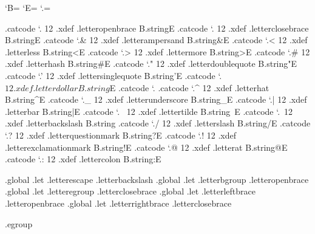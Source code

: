 


\bgroup

\catcode`B=\begingroupcatcode
\catcode`E=\endgroupcatcode
\catcode`.=\escapecatcode

.catcode `.{ 12 .xdef .letteropenbrace       B.string{E
.catcode `.} 12 .xdef .letterclosebrace      B.string}E
.catcode `.& 12 .xdef .letterampersand       B.string&E
.catcode `.< 12 .xdef .letterless            B.string<E
.catcode `.> 12 .xdef .lettermore            B.string>E
.catcode `.# 12 .xdef .letterhash            B.string#E
.catcode `." 12 .xdef .letterdoublequote     B.string"E
.catcode `.' 12 .xdef .lettersinglequote     B.string'E
.catcode `.$ 12 .xdef .letterdollar          B.string$E
.catcode `.%
.catcode `.^ 12 .xdef .letterhat             B.string^E
.catcode `._ 12 .xdef .letterunderscore      B.string_E
.catcode `.| 12 .xdef .letterbar             B.string|E
.catcode `.~ 12 .xdef .lettertilde           B.string~E
.catcode `.\ 12 .xdef .letterbackslash       B.string\E
.catcode `./ 12 .xdef .letterslash           B.string/E
.catcode `.? 12 .xdef .letterquestionmark    B.string?E
.catcode `.! 12 .xdef .letterexclamationmark B.string!E
.catcode `.@ 12 .xdef .letterat              B.string@E
.catcode `.: 12 .xdef .lettercolon           B.string:E

         .global .let .letterescape     .letterbackslash
         .global .let .letterbgroup     .letteropenbrace
         .global .let .letteregroup     .letterclosebrace
         .global .let .letterleftbrace  .letteropenbrace
         .global .let .letterrightbrace .letterclosebrace

.egroup


